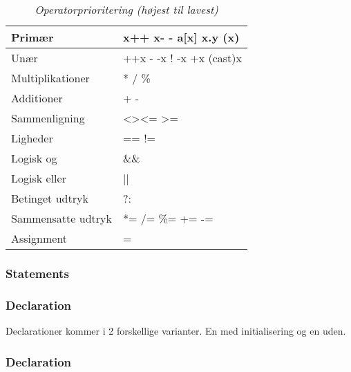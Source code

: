 \begin{table}[H]
    \centering
    \begin{tabular}{|l|l|}
        \hline
        \centering

        Primær             & x++ \quad x- - \quad a{[}x{]} \quad x.y \quad (x)                 \\ \hline
        Unær               & ++x \quad - -x \quad ! \quad -x \quad +x \quad (cast)x       \\ \hline
        Multiplikationer   & * \quad / \quad \%                                               \\ \hline
        Additioner         & + \quad -                                                        \\ \hline
        Sammenligning      & \textless \quad \textgreater \quad \textless= \quad\textgreater= \\ \hline
        Ligheder           & == \quad !=                                                      \\ \hline
        Logisk og          & \&\&                                                              \\ \hline
        Logisk eller       & ||                                                               \\ \hline
        Betinget udtryk    & ?:                                                               \\ \hline
        Sammensatte udtryk & *= \quad /= \quad \%= \quad += \quad -=                          \\ \hline
        Assignment         & =                                                                \\ \hline

    \end{tabular}
    \caption{\textit{Operatorprioritering (højest til lavest)}}
    \label{tab:operatorprioritering}
\end{table}





\subsubsection{Statements}



\subsubsection{Declaration}
Declarationer kommer i 2 forskellige varianter. En med initialisering og en uden.




\subsubsection{Declaration}


\subsubsection{}
